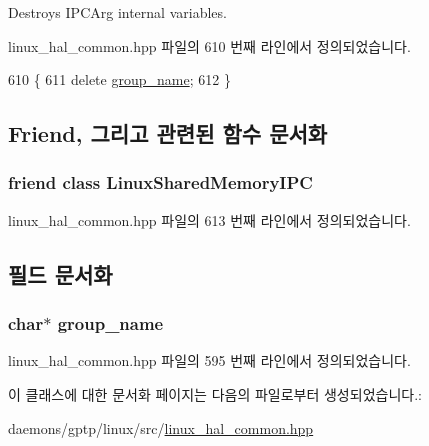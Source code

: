 Destroys I\+P\+C\+Arg internal variables. 



linux\+\_\+hal\+\_\+common.\+hpp 파일의 610 번째 라인에서 정의되었습니다.


\begin{DoxyCode}
610                            \{
611         \textcolor{keyword}{delete} \hyperlink{class_linux_i_p_c_arg_af79ba313643b1c6e634d705221930b84}{group\_name};
612     \}
\end{DoxyCode}


\subsection{Friend, 그리고 관련된 함수 문서화}
\subsubsection[{\texorpdfstring{Linux\+Shared\+Memory\+I\+PC}{LinuxSharedMemoryIPC}}]{\setlength{\rightskip}{0pt plus 5cm}friend class {\bf Linux\+Shared\+Memory\+I\+PC}\hspace{0.3cm}{\ttfamily [friend]}}\hypertarget{class_linux_i_p_c_arg_aeae599235e9ea7e0d428f88aceb3f284}{}\label{class_linux_i_p_c_arg_aeae599235e9ea7e0d428f88aceb3f284}


linux\+\_\+hal\+\_\+common.\+hpp 파일의 613 번째 라인에서 정의되었습니다.



\subsection{필드 문서화}
\subsubsection[{\texorpdfstring{group\+\_\+name}{group_name}}]{\setlength{\rightskip}{0pt plus 5cm}char$\ast$ group\+\_\+name\hspace{0.3cm}{\ttfamily [private]}}\hypertarget{class_linux_i_p_c_arg_af79ba313643b1c6e634d705221930b84}{}\label{class_linux_i_p_c_arg_af79ba313643b1c6e634d705221930b84}


linux\+\_\+hal\+\_\+common.\+hpp 파일의 595 번째 라인에서 정의되었습니다.



이 클래스에 대한 문서화 페이지는 다음의 파일로부터 생성되었습니다.\+:\begin{DoxyCompactItemize}
\item 
daemons/gptp/linux/src/\hyperlink{linux__hal__common_8hpp}{linux\+\_\+hal\+\_\+common.\+hpp}\end{DoxyCompactItemize}
